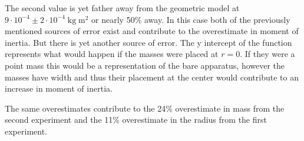 \documentclass[11pt]{article}
\begin{document}
The second value is yet father away from the geometric model at \(9 \cdot 10^{-4} \pm 2 \cdot 10 ^{-4}  \; \mathrm{kg} \; \mathrm{m}^2 \) or nearly 50\% away. In this case both of the previously mentioned sources of error exist and contribute to the overestimate in moment of inertia. But there is yet another source of error. The y intercept of the function represents what would happen if the masses were placed at \(r = 0\). If they were a point mass this would be a representation of the bare apparatus, however the masses have width and thus their placement at the center would contribute to an increase in moment of inertia.

The same overestimates contribute to the 24\% overestimate in mass from the second experiment and the 11\% overestimate in the radius from the first experiment.
\end{document}
